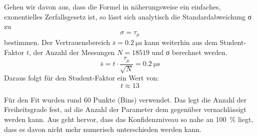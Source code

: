 Gehen wir davon aus, dass die Formel in  näherungsweise ein einfaches,
exonentielles Zerfallsgesetz ist, so lässt sich analytisch die Standardabweichung
σ zu
\begin{equation}
 σ = τ_μ
\end{equation}
bestimmen. Der Vertrauensbereich $\bar{s} = \SI{0,2}{\micro\second}$ kann weiterhin
aus dem Student-Faktor $t$, der Anzahl der Messungen $N = 18519$ und σ berechnet werden.
\begin{equation}
 \bar{s} = t \cdot \frac{τ_μ}{\sqrt{N}} = \SI{0,2}{\micro\second}
\end{equation}
Daraus folgt für den Student-Faktor ein Wert von:
\begin{equation}
 t \approx 13
\end{equation}

Für den Fit wurden rund 60 Punkte (Bins) verwendet. Das legt die Anzahl der Freiheitsgrade
fest, ad die Anzahl der Parameter dem gegenüber vernachlässigt werden kann.
Aus \cite{student} geht hervor, dass das Konfidenzniveau so nahe an \SI{100}{\percent}
liegt, dass es davon nicht mehr numerisch unterschieden werden kann.
